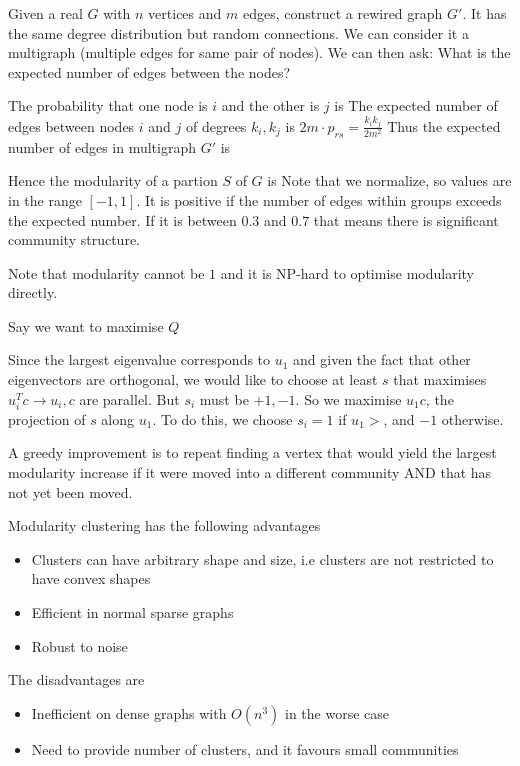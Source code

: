     Given a real $G$ with $n$ vertices and $m$ edges, construct a rewired graph $G'$. It has the same degree distribution but random connections. We can consider it a multigraph (multiple edges for same pair of nodes). We can then ask: What is the expected number of edges between the nodes?
    
    The probability that one node is $i$ and the other is $j$ is 
    The expected number of edges between nodes $i$ and $j$ of degrees $k_i, k_j$ is $2m \cdot p_{rs} = \frac{k_i k_j}{2m^2}$
    Thus the expected number of edges in multigraph $G'$ is 
    
    Hence the modularity of a partion $S$ of $G$ is 
    Note that we normalize, so values are in the range $[-1, 1]$. It is positive if the number of edges within groups exceeds the expected number. If it is between $0.3$ and $0.7$ that means there is significant community structure. 
    
    Note that modularity cannot be $1$ and it is NP-hard to optimise modularity directly. 
    
    Say we want to maximise $Q$
    
    Since the largest eigenvalue corresponds to $u_1$ and given the fact that other eigenvectors are orthogonal, we would like to choose at least $s$ that maximises $u_i^T c \rightarrow u_i, c$ are parallel. But $s_i$ must be $+1, -1$. So we maximise $u_1 c$, the projection of $s$ along $u_1$. To do this, we choose $s_i = 1$ if $u_1 \gt$, and $-1$ otherwise. 
    
    A greedy improvement is to repeat finding a vertex that would yield the largest modularity increase if it were moved into a different community AND that has not yet been moved. 
    
    Modularity clustering has the following advantages
    \begin{itemize}
        \item Clusters can have arbitrary shape and size, i.e clusters are not restricted to have convex shapes
        \item Efficient in normal sparse graphs
        \item Robust to noise
    \end{itemize}
    The disadvantages are
    \begin{itemize}
        \item Inefficient on dense graphs with $O(n^3)$ in the worse case
        \item Need to provide number of clusters, and it favours small communities
    \end{itemize}
    

